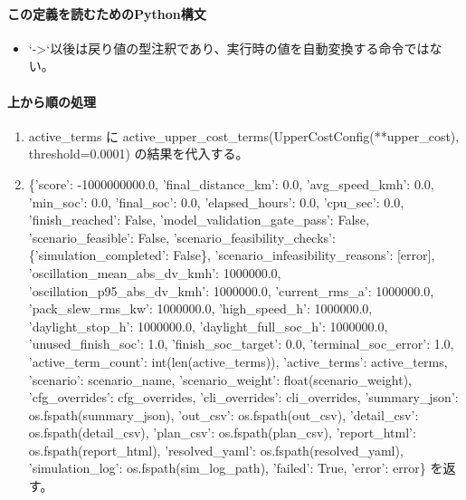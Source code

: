 \documentclass[a4paper,11pt]{article}
\begin{document}
            \paragraph{この定義を読むためのPython構文}
            \begin{itemize}[leftmargin=1.6em]
            \item `->`以後は戻り値の型注釈であり、実行時の値を自動変換する命令ではない。
            \end{itemize}
            \paragraph{上から順の処理}
            \begin{enumerate}[leftmargin=1.8em]
            \item active\_terms に active\_upper\_cost\_terms(UpperCostConfig(**upper\_cost), threshold=0.0001) の結果を代入する。
\item \{'score': -1000000000.0, 'final\_distance\_km': 0.0, 'avg\_speed\_kmh': 0.0, 'min\_soc': 0.0, 'final\_soc': 0.0, 'elapsed\_hours': 0.0, 'cpu\_sec': 0.0, 'finish\_reached': False, 'model\_validation\_gate\_pass': False, 'scenario\_feasible': False, 'scenario\_feasibility\_checks': \{'simulation\_completed': False\}, 'scenario\_infeasibility\_reasons': [error], 'oscillation\_mean\_abs\_dv\_kmh': 1000000.0, 'oscillation\_p95\_abs\_dv\_kmh': 1000000.0, 'current\_rms\_a': 1000000.0, 'pack\_slew\_rms\_kw': 1000000.0, 'high\_speed\_h': 1000000.0, 'daylight\_stop\_h': 1000000.0, 'daylight\_full\_soc\_h': 1000000.0, 'unused\_finish\_soc': 1.0, 'finish\_soc\_target': 0.0, 'terminal\_soc\_error': 1.0, 'active\_term\_count': int(len(active\_terms)), 'active\_terms': active\_terms, 'scenario': scenario\_name, 'scenario\_weight': float(scenario\_weight), 'cfg\_overrides': cfg\_overrides, 'cli\_overrides': cli\_overrides, 'summary\_json': os.fspath(summary\_json), 'out\_csv': os.fspath(out\_csv), 'detail\_csv': os.fspath(detail\_csv), 'plan\_csv': os.fspath(plan\_csv), 'report\_html': os.fspath(report\_html), 'resolved\_yaml': os.fspath(resolved\_yaml), 'simulation\_log': os.fspath(sim\_log\_path), 'failed': True, 'error': error\} を返す。
            \end{enumerate}
\end{document}
